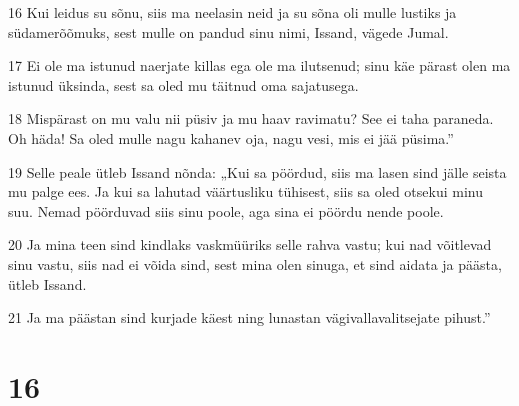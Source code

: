 \par 16 Kui leidus su sõnu, siis ma neelasin neid ja su sõna oli mulle lustiks ja südamerõõmuks, sest mulle on pandud sinu nimi, Issand, vägede Jumal.
\par 17 Ei ole ma istunud naerjate killas ega ole ma ilutsenud; sinu käe pärast olen ma istunud üksinda, sest sa oled mu täitnud oma sajatusega.
\par 18 Mispärast on mu valu nii püsiv ja mu haav ravimatu? See ei taha paraneda. Oh häda! Sa oled mulle nagu kahanev oja, nagu vesi, mis ei jää püsima.”
\par 19 Selle peale ütleb Issand nõnda: „Kui sa pöördud, siis ma lasen sind jälle seista mu palge ees. Ja kui sa lahutad väärtusliku tühisest, siis sa oled otsekui minu suu. Nemad pöörduvad siis sinu poole, aga sina ei pöördu nende poole.
\par 20 Ja mina teen sind kindlaks vaskmüüriks selle rahva vastu; kui nad võitlevad sinu vastu, siis nad ei võida sind, sest mina olen sinuga, et sind aidata ja päästa, ütleb Issand.
\par 21 Ja ma päästan sind kurjade käest ning lunastan vägivallavalitsejate pihust.”

\chapter{16}

